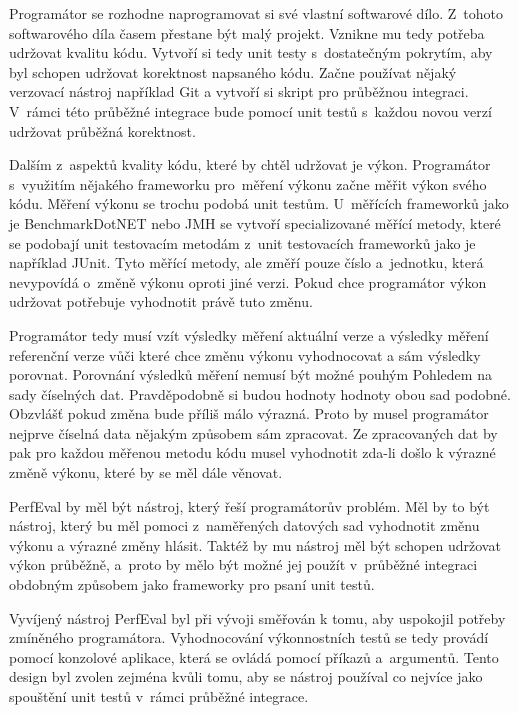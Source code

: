 Programátor se rozhodne naprogramovat si své vlastní softwarové dílo. Z~tohoto softwarového díla
časem přestane být malý projekt. Vznikne mu tedy potřeba udržovat kvalitu kódu.
Vytvoří si tedy unit testy s~dostatečným pokrytím, aby byl schopen udržovat korektnost napsaného kódu.
Začne používat nějaký verzovací nástroj například Git a vytvoří si skript pro průběžnou integraci.
V~rámci této průběžné integrace bude pomocí unit testů s~každou novou verzí udržovat průběžná korektnost.

Dalším z~aspektů kvality kódu, které by chtěl udržovat je výkon. Programátor s~využitím nějakého frameworku pro~měření výkonu začne měřit výkon svého kódu.
Měření výkonu se trochu podobá unit testům. U~měřících frameworků jako je BenchmarkDotNET nebo JMH se vytvoří specializované měřící metody,
které se podobají unit testovacím metodám z~unit testovacích frameworků jako je například JUnit.
Tyto měřící metody, ale změří pouze číslo a~jednotku, která nevypovídá o~změně výkonu oproti jiné verzi.
Pokud chce programátor výkon udržovat potřebuje vyhodnotit právě tuto změnu.

Programátor tedy musí vzít výsledky měření aktuální verze a výsledky měření referenční verze vůči které chce
změnu výkonu vyhodnocovat a sám výsledky porovnat. Porovnání výsledků měření nemusí být možné pouhým Pohledem
na sady číselných dat. Pravděpodobně si budou hodnoty hodnoty obou sad podobné. Obzvlášť pokud změna bude příliš málo výrazná.
Proto by musel programátor nejprve číselná data nějakým způsobem sám zpracovat. Ze zpracovaných dat by pak pro každou měřenou metodu
kódu musel vyhodnotit zda-li došlo k výrazné změně výkonu, které by se měl dále věnovat.

PerfEval by měl být nástroj, který řeší programátorův problém. Měl by to být nástroj, který bu měl pomoci
z~naměřených datových sad vyhodnotit změnu výkonu a výrazné změny hlásit. Taktéž by mu nástroj měl být schopen
udržovat výkon průběžně, a~proto by mělo být možné jej použít v~průběžné integraci obdobným způsobem jako frameworky
pro psaní unit testů.

Vyvíjený nástroj PerfEval byl při vývoji směřován k tomu, aby uspokojil potřeby zmíněného programátora.
Vyhodnocování výkonnostních testů se tedy provádí pomocí konzolové aplikace, která se ovládá pomocí
příkazů a~argumentů. Tento design byl zvolen zejména kvůli tomu, aby se nástroj používal co nejvíce
jako spouštění unit testů v~rámci průběžné integrace.
